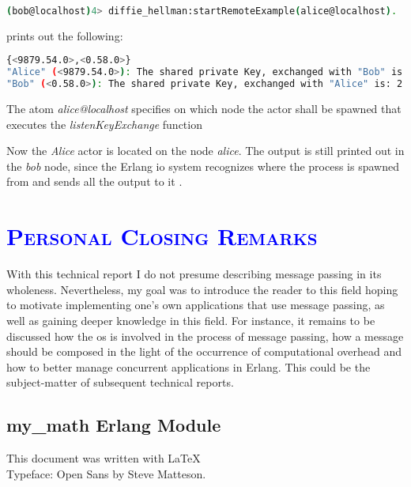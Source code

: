 \documentclass[xcolor=dvipsnames]{article}
\begin{document}
\begin{lstlisting}[language=bash]
(bob@localhost)4> diffie_hellman:startRemoteExample(alice@localhost).
\end{lstlisting}

\noindent prints out the following:

\begin{lstlisting}[language=bash]
{<9879.54.0>,<0.58.0>}
"Alice" (<9879.54.0>): The shared private Key, exchanged with "Bob" is: 2
"Bob" (<0.58.0>): The shared private Key, exchanged with "Alice" is: 2
\end{lstlisting}

\noindent The atom \textit{alice@localhost} specifies on which node the actor shall be spawned that executes the \textit{listenKeyExchange} function

\noindent Now the \textit{Alice} actor is located on the node \textit{alice}. The output is still printed out in the \textit{bob} node, since the Erlang io system recognizes where the process is spawned from and sends all the output to it \cite[ch. 4.3.4 on p. 104]{erl_doc}.

\section{\scshape{\textcolor{blue}{Personal Closing Remarks}}}

\noindent With this technical report I do not presume describing message passing in its wholeness. Nevertheless, my goal was to introduce the reader to this field hoping to motivate implementing one's own applications that use message passing, as well as gaining deeper knowledge in this field. For instance, it remains to be discussed how the \gls{os} is involved in the process of message passing, how a message should be composed in the light of the occurrence of computational overhead and how to better manage concurrent applications in Erlang. This could be the subject-matter of subsequent technical reports.

\newpage 

\begin{appendix}

\section{my\_math Erlang Module}\label{my_math}



\end{appendix}

\printnoidxglossaries

\newpage




\vfill
\begin{center}
This document was written with \LaTeX 
\\Typeface: Open Sans by Steve Matteson.
\end{center}

\end{document}
